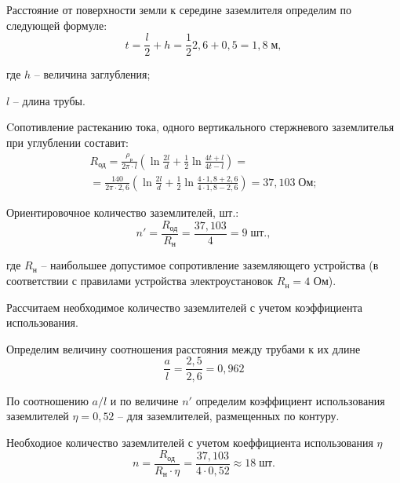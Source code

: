         Расстояние от поверхности земли к середине заземлителя определим по
        следующей формуле:
        \begin{equation*}
            t = \frac{l}{2} + h = 
                \frac{1}{2} 2,6 + 0,5 = 1,8 \; \text{м},
        \end{equation*}

        где $h$ -- величина заглубления;\par
        $l$ -- длина трубы.

        Cопотивление растеканию тока, одного вертикального стержневого
        заземлителья при углублении составит:
        \begin{gather*}
            R_\text{од} = \frac{\rho_\text{р}}{2\pi \cdot l}
                \left( \ln \frac{2l}{d} + \frac{1}{2} 
                    \ln \frac{4t + l}{4t - l} \right) =\\
            = \frac{140}{2\pi \cdot 2,6}
                \left( \ln \frac{2l}{d} + \frac{1}{2} 
                    \ln \frac{4 \cdot 1,8 + 2,6}{4 \cdot 1,8 - 2,6} \right)
                        = 37,103 \; \text{Ом};
        \end{gather*}

        Ориентировочное количество заземлителей, шт.:
        \begin{equation*}
            n' = \frac{R_\text{од}}{R_\text{н}}
                = \frac{37,103}{4} = 9 \; \text{шт.},
        \end{equation*}

        где $R_\text{н}$ -- наибольшее допустимое сопротивление
        заземляющего устройства (в соответствии с правилами устройства
        электроустановок $R_\text{н} = 4$ Ом). 

        Рассчитаем необходимое количество заземлителей с учетом коэффициента
        использования.

        Определим величину соотношения расстояния между трубами к их длине
        \begin{equation*}
            \frac{a}{l} = \frac{2,5}{2,6} = 0,962
        \end{equation*}

        По соотношению $a/l$  и по величине $n'$ определим
        коэффициент использования заземлителей $\eta = 0,52$  -- для
        заземлителей, размещенных по контуру.

        Необходиое количество заземлителей с учетом коеффициента использования
        $\eta$
        \begin{equation*}
            n = \frac{R_\text{од}}{R_\text{н} \cdot \eta} =
                \frac{37,103}{4 \cdot 0,52} \approx 18 \; \text{шт}.
        \end{equation*}

